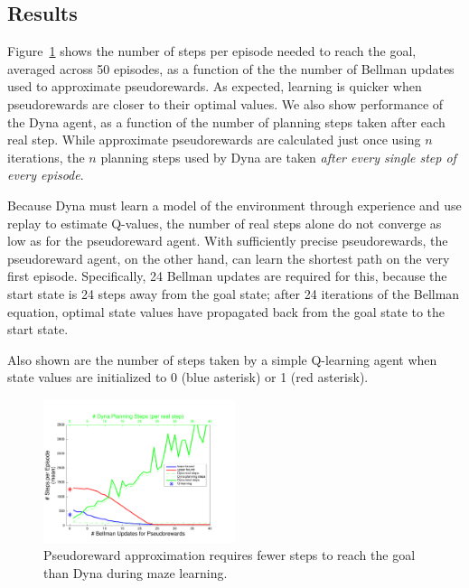 \documentclass[letterpaper]{article}
\begin{document}
\subsection{Results}

Figure~\ref{fig:maze1} shows the number of steps per episode needed to reach the goal, averaged across 50 episodes, as a function of the the number of Bellman updates used to approximate pseudorewards.
As expected, learning is quicker when pseudorewards are closer to their optimal values. We also show performance of the Dyna agent, as a function of the number of planning steps taken after each real step.
While approximate pseudorewards are calculated just once using $n$ iterations, the $n$ planning steps used by Dyna are taken \textit{after every single step of every episode}.

Because Dyna must learn a model of the environment through experience and use replay to estimate Q-values, the number of real steps alone do not converge as low as for the pseudoreward agent. With sufficiently precise pseudorewards, the pseudoreward agent, on the other hand, can learn the shortest path on the very first episode. Specifically, 24 Bellman updates are required for this, because the start state is 24 steps away from the goal state; after 24 iterations of the Bellman equation, optimal state values have propagated back from the goal state to the start state.

Also shown are the number of steps taken by a simple Q-learning agent when state values are initialized to 0 (blue asterisk) or 1 (red asterisk).

\begin{figure}[t]
\centering
\includegraphics[width=0.5\textwidth]{learning_vs_PRiterations_DYNA_mean}
\caption{Pseudoreward approximation requires fewer steps to reach the goal than Dyna during maze learning.}
\label{fig:maze1}
\end{figure}
\end{document}
